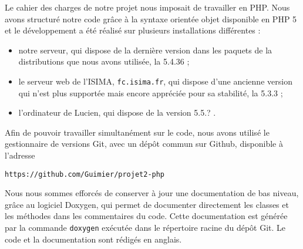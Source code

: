 Le cahier des charges de notre projet nous imposait de travailler en PHP. Nous avons structuré notre code grâce à la syntaxe orientée objet disponible en PHP 5 et le développement a été réalisé sur plusieurs installations différentes :
\begin{itemize}
	\item notre serveur, qui dispose de la dernière version dans les paquets de la distributions que nous avons utilisée, la 5.4.36 ;
	\item le serveur web de l’ISIMA, \texttt{fc.isima.fr}, qui dispose d’une ancienne version qui n’est plus supportée mais encore appréciée pour sa stabilité, la 5.3.3 ;
	\item l’ordinateur de Lucien, qui dispose de la version 5.5.? .
\end{itemize}

Afin de pouvoir travailler simultanément sur le code, nous avons utilisé le gestionnaire de versions Git, avec un dépôt commun sur Github, disponible à l’adresse
\begin{verbatim}
https://github.com/Guimier/projet2-php
\end{verbatim}

Nous nous sommes efforcés de conserver à jour une documentation de bas niveau, grâce au logiciel Doxygen, qui permet de documenter directement les classes et les méthodes dans les commentaires du code. Cette documentation est générée par la commande \texttt{doxygen} exécutée dans le répertoire racine du dépôt Git. Le code et la documentation sont rédigés en anglais.
